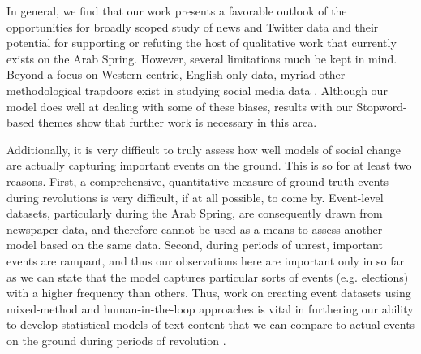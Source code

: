 In general, we find that our work presents a favorable outlook of the opportunities for broadly scoped study of news and Twitter data and their potential for supporting or refuting the host of qualitative work that currently exists on the Arab Spring.  However, several limitations much be kept in mind. Beyond a focus on Western-centric, English only data, myriad other methodological trapdoors exist in studying social media data \cite{tufekci_big_2014,ruths_social_2014,morstatter_is_2013}. Although our model does well at dealing with some of these biases, results with our Stopword-based themes show that further work is necessary in this area.

Additionally, it is very difficult to truly assess how well models of social change are actually capturing important events on the ground.  This is so for at least two reasons. First, a comprehensive, quantitative measure of ground truth events during revolutions is very difficult, if at all possible, to come by.  Event-level datasets, particularly during the Arab Spring, are consequently drawn from newspaper data, and  therefore cannot be used as a means to assess another model based on the same data.  Second, during periods of unrest, important events are rampant, and thus our observations here are important only in so far as we can state that the model captures particular sorts of events (e.g. elections) with a higher frequency than others.  Thus, work on creating event datasets using mixed-method and human-in-the-loop approaches is vital in furthering our ability to develop statistical models of text content that we can compare to actual events on the ground during periods of revolution \citep{hanna_developing_2014}.